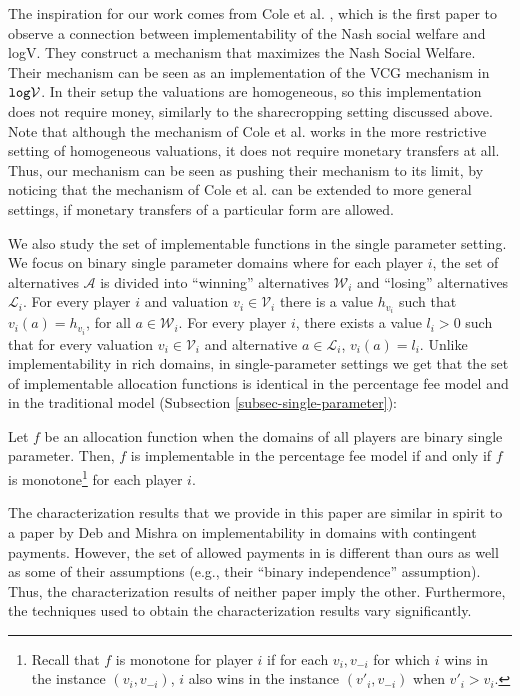 \documentclass{article}
\newcommand{\cV}{{\mathcal V}}
\begin{document}
The inspiration for our work comes from Cole et al. \cite{CGG13}, which is the first paper to observe a connection between implementability of the Nash social welfare and logV. They construct a mechanism that maximizes the Nash Social Welfare. Their mechanism can be seen as an implementation of the VCG mechanism in $ {\tt log} \cV$. In their setup the valuations are homogeneous, so this implementation does not require money, similarly to the sharecropping setting discussed above. {Note that although the mechanism of Cole et al. \cite{CGG13} works in the more restrictive setting of homogeneous valuations, it does not require monetary transfers at all. Thus, our mechanism can be seen as pushing their mechanism to its limit, by noticing that the mechanism of Cole et al. \cite{CGG13} can be extended to more general settings, if monetary transfers of a particular form are allowed}.


We also study the set of implementable functions in the single parameter setting. We focus on binary single parameter domains where  for each player $i$, the set of alternatives $\mathcal A$ is divided into ``winning'' alternatives $\mathcal W_i$ and ``losing'' alternatives $\mathcal L_i$. For every player $i$ and valuation $v_i\in \mathcal V_i$ there is a value $h_{v_i}$ such that $v_i(a)=h_{v_i}$, for all $a\in \mathcal W_i$. For every player $i$, there exists a value $l_i>0$ such that for every valuation $v_i\in \mathcal V_i$ and alternative $a\in \mathcal L_i$, $v_i(a)=l_i$. Unlike implementability in rich domains, in single-parameter settings we get that the set of implementable allocation functions is identical in the percentage fee model and in the traditional model (Subsection \ref{subsec-single-parameter}):

\begin{theorem*}
Let $f$ be an allocation function when the domains of all players are binary single parameter. Then, $f$ is implementable in the percentage fee model if and only if $f$ is monotone\footnote{Recall that $f$ is monotone for player $i$ if for each $v_i, v_{-i}$ for which $i$ wins in the instance $(v_i,v_{-i})$, $i$ also wins in the instance $(v'_i,v_{-i})$ when $v'_i>v_i$.} for each player $i$.    
\end{theorem*}

The characterization results that we provide in this paper are similar in spirit to a paper by Deb and Mishra \cite{DM2014} on implementability in domains with contingent payments. However, the set of allowed payments in \cite{DM2014} is different than ours as well as some of their assumptions (e.g., their ``binary independence'' assumption). Thus, the characterization results of neither paper imply the other. Furthermore, the techniques used to obtain the characterization results vary significantly.
\end{document}
